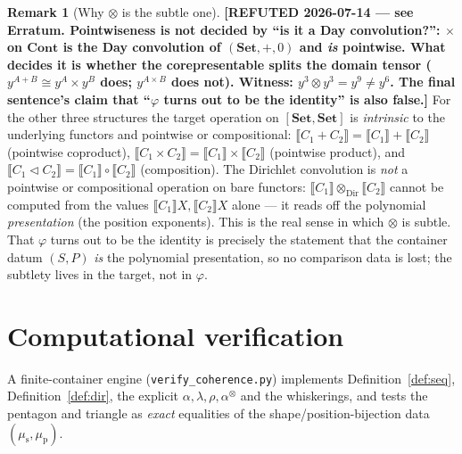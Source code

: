 \documentclass[11pt]{article}
\theoremstyle{definition}
\newtheorem{remark}{Remark}
\newcommand{\Set}{\mathbf{Set}}
\newcommand{\Cont}{\mathbf{Cont}}
\newcommand{\ext}[1]{\llbracket #1 \rrbracket}
\newcommand{\tri}{\mathbin{\triangleleft}}
\newcommand{\dir}{\mathbin{\otimes}}
\begin{document}
\begin{remark}[Why $\dir$ is the subtle one]\label{rem:subtle}
\textbf{[REFUTED 2026-07-14 --- see Erratum. Pointwiseness is not decided by
``is it a Day convolution?'': $\times$ on $\Cont$ is the Day convolution of
$(\Set,+,0)$ and \emph{is} pointwise. What decides it is whether the
corepresentable splits the domain tensor ($y^{A+B}\cong y^A\times y^B$ does;
$y^{A\times B}$ does not). Witness: $y^3\dir y^3=y^9\ne y^6$. The final
sentence's claim that ``$\varphi$ turns out to be the identity'' is also
false.]}
For the other three structures the target operation on $[\Set,\Set]$ is
\emph{intrinsic} to the underlying functors and pointwise or compositional:
$\ext{C_1+C_2}=\ext{C_1}+\ext{C_2}$ (pointwise coproduct),
$\ext{C_1\times C_2}=\ext{C_1}\times\ext{C_2}$ (pointwise product), and
$\ext{C_1\tri C_2}=\ext{C_1}\circ\ext{C_2}$ (composition). The Dirichlet
convolution is \emph{not} a pointwise or compositional operation on bare
functors: $\ext{C_1}\dir_{\mathrm{Dir}}\ext{C_2}$ cannot be computed from the
values $\ext{C_1}X,\ext{C_2}X$ alone --- it reads off the polynomial
\emph{presentation} (the position exponents). This is the real sense in which
$\dir$ is subtle. That $\varphi$ turns out to be the identity is precisely the
statement that the container datum $(S,P)$ \emph{is} the polynomial
presentation, so no comparison data is lost; the subtlety lives in the target,
not in $\varphi$.
\end{remark}

\section{Computational verification}

A finite-container engine (\texttt{verify\_coherence.py}) implements
Definition~\ref{def:seq}, Definition~\ref{def:dir}, the explicit
$\alpha,\lambda,\rho,\alpha^{\dir}$ and the whiskerings, and tests the pentagon
and triangle as \emph{exact} equalities of the shape/position-bijection data
$(\mu_{\mathrm s},\mu_{\mathrm p})$.
\end{document}

